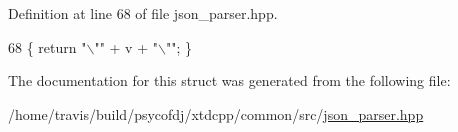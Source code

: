 Definition at line 68 of file json\-\_\-parser.\-hpp.


\begin{DoxyCode}
68 \{ \textcolor{keywordflow}{return} \textcolor{stringliteral}{"\(\backslash\)""} + v + \textcolor{stringliteral}{"\(\backslash\)""};           \}
\end{DoxyCode}


The documentation for this struct was generated from the following file\-:\begin{DoxyCompactItemize}
\item 
/home/travis/build/psycofdj/xtdcpp/common/src/\hyperlink{json__parser_8hpp}{json\-\_\-parser.\-hpp}\end{DoxyCompactItemize}
